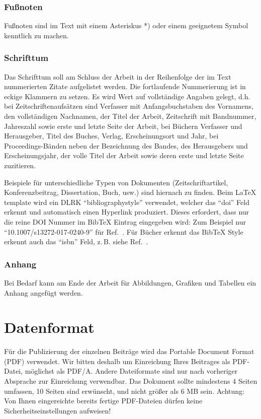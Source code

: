 \documentclass[german,10pt]{DLRK_v1.11}
\begin{document}
\subsubsection{Fu\ss noten}
Fußnoten sind im Text mit einem Asteriskus *) oder einem geeignetem Symbol kenntlich zu machen.

\subsubsection{Schrifttum}
Das Schrifttum soll am Schluss der Arbeit in der Reihenfolge der im Text nummerierten Zitate aufgelistet werden. Die fortlaufende Nummerierung ist in eckige Klammern zu setzen. Es wird Wert auf vollständige Angaben gelegt, d.h. bei Zeitschriftenaufsätzen sind Verfasser mit Anfangsbuchstaben des Vornamens, den vollständigen Nachnamen, der Titel der Arbeit, Zeitschrift mit Bandnummer, Jahreszahl sowie erste und letzte Seite der Arbeit, bei Büchern Verfasser und Herausgeber, Titel des Buches, Verlag, Erscheinungsort und Jahr, bei Proceedings-Bänden neben der Bezeichnung des Bandes, des Herausgebers und Erscheinungsjahr, der volle Titel der Arbeit sowie deren erste und letzte Seite zuzitieren.

Beispiele für unterschiedliche Typen von Dokumenten (Zeitschriftartikel, Konferenzbeitrag, Dissertation, Buch, usw.) sind hiernach zu finden. Beim \LaTeX{} template wird ein DLRK ``bibliographystyle'' verwendet, welcher das ``doi'' Feld erkennt und automatisch einen Hyperlink produziert. Dieses erfordert, dass nur die reine DOI Nummer im BibTeX Eintrag eingegeben wird: Zum Beispiel nur ``10.1007/s13272-017-0240-9'' für Ref.~\cite{FezSchFis2017}. Für Bücher erkennt das BibTeX Style erkennt auch das ``isbn'' Feld, z.\,B. siehe Ref.~\cite{zhou1996robust}.\nocite{PhD_Thesis_Koethe,SchFezNie2019,NASA_TM4511,ISO1151-1:1988}

\subsubsection{Anhang}
Bei Bedarf kann am Ende der Arbeit für Abbildungen, Grafiken und Tabellen ein Anhang angefügt werden.

\section{Datenformat}
Für die Publizierung der einzelnen Beiträge wird das Portable Document Format (PDF) verwendet. Wir bitten deshalb um Einreichung Ihres Beitrages als PDF-Datei, möglichst als PDF/A. Andere Dateiformate sind nur nach vorheriger Absprache zur Einreichung verwendbar. Das Dokument sollte mindestens 4 Seiten umfassen, 10 Seiten sind erwünscht, und nicht größer als 6 MB sein. Achtung: Von Ihnen eingereichte bereits fertige PDF-Dateien dürfen keine Sicherheitseinstellungen aufweisen!
\end{document}
